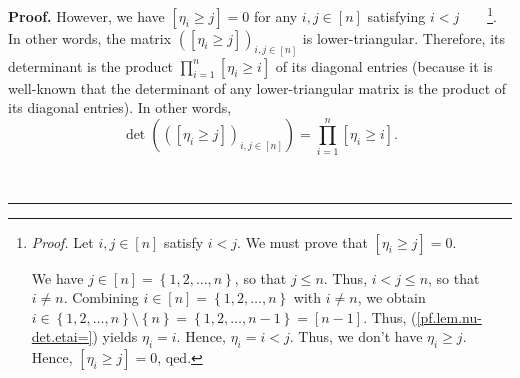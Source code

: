 \documentclass[numbers=enddot,12pt,final,onecolumn,notitlepage,english]{scrartcl}%
\theoremstyle{definition}
\newenvironment{proof}[1][Proof]{\noindent\textbf{#1.} }{\ \rule{0.5em}{0.5em}}
\let\prodnonlimits\prod
\renewcommand{\prod}{\prodnonlimits\limits}
\newenvironment{verlong}{}{}
\begin{document}
\begin{proof}
\begin{verlong}
However, we have $\left[  \eta_{i}\geq j\right]  =0$ for any $i,j\in\left[
n\right]  $ satisfying $i<j$\ \ \ \ \footnote{\textit{Proof.} Let
$i,j\in\left[  n\right]  $ satisfy $i<j$. We must prove that $\left[  \eta
_{i}\geq j\right]  =0$.
\par
We have $j\in\left[  n\right]  =\left\{  1,2,\ldots,n\right\}  $, so that
$j\leq n$. Thus, $i<j\leq n$, so that $i\neq n$. Combining $i\in\left[
n\right]  =\left\{  1,2,\ldots,n\right\}  $ with $i\neq n$, we obtain
$i\in\left\{  1,2,\ldots,n\right\}  \setminus\left\{  n\right\}  =\left\{
1,2,\ldots,n-1\right\}  =\left[  n-1\right]  $. Thus,
(\ref{pf.lem.nu-det.etai=}) yields $\eta_{i}=i$. Hence, $\eta_{i}=i<j$. Thus,
we don't have $\eta_{i}\geq j$. Hence, $\left[  \eta_{i}\geq j\right]  =0$,
qed.}. In other words, the matrix $\left(  \left[  \eta_{i}\geq j\right]
\right)  _{i,j\in\left[  n\right]  }$ is lower-triangular. Therefore, its
determinant is the product $\prod_{i=1}^{n}\left[  \eta_{i}\geq i\right]  $ of
its diagonal entries (because it is well-known that the determinant of any
lower-triangular matrix is the product of its diagonal entries). In other
words,%
\begin{equation}
\det\left(  \left(  \left[  \eta_{i}\geq j\right]  \right)  _{i,j\in\left[
n\right]  }\right)  =\prod_{i=1}^{n}\left[  \eta_{i}\geq i\right]  .
\label{pf.lem.nu-det.c2.det=2}%
\end{equation}



\end{verlong}
\end{proof}
\end{document}
